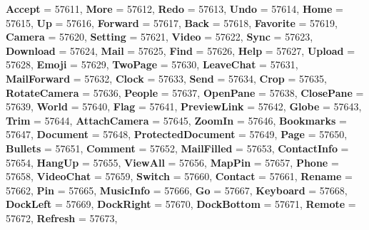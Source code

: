 \begin{DoxyCompactItemize}
{\bfseries Accept} = 57611, 
\newline
{\bfseries More} = 57612, 
{\bfseries Redo} = 57613, 
{\bfseries Undo} = 57614, 
{\bfseries Home} = 57615, 
\newline
{\bfseries Up} = 57616, 
{\bfseries Forward} = 57617, 
{\bfseries Back} = 57618, 
{\bfseries Favorite} = 57619, 
\newline
{\bfseries Camera} = 57620, 
{\bfseries Setting} = 57621, 
{\bfseries Video} = 57622, 
{\bfseries Sync} = 57623, 
\newline
{\bfseries Download} = 57624, 
{\bfseries Mail} = 57625, 
{\bfseries Find} = 57626, 
{\bfseries Help} = 57627, 
\newline
{\bfseries Upload} = 57628, 
{\bfseries Emoji} = 57629, 
{\bfseries Two\+Page} = 57630, 
{\bfseries Leave\+Chat} = 57631, 
\newline
{\bfseries Mail\+Forward} = 57632, 
{\bfseries Clock} = 57633, 
{\bfseries Send} = 57634, 
{\bfseries Crop} = 57635, 
\newline
{\bfseries Rotate\+Camera} = 57636, 
{\bfseries People} = 57637, 
{\bfseries Open\+Pane} = 57638, 
{\bfseries Close\+Pane} = 57639, 
\newline
{\bfseries World} = 57640, 
{\bfseries Flag} = 57641, 
{\bfseries Preview\+Link} = 57642, 
{\bfseries Globe} = 57643, 
\newline
{\bfseries Trim} = 57644, 
{\bfseries Attach\+Camera} = 57645, 
{\bfseries Zoom\+In} = 57646, 
{\bfseries Bookmarks} = 57647, 
\newline
{\bfseries Document} = 57648, 
{\bfseries Protected\+Document} = 57649, 
{\bfseries Page} = 57650, 
{\bfseries Bullets} = 57651, 
\newline
{\bfseries Comment} = 57652, 
{\bfseries Mail\+Filled} = 57653, 
{\bfseries Contact\+Info} = 57654, 
{\bfseries Hang\+Up} = 57655, 
\newline
{\bfseries View\+All} = 57656, 
{\bfseries Map\+Pin} = 57657, 
{\bfseries Phone} = 57658, 
{\bfseries Video\+Chat} = 57659, 
\newline
{\bfseries Switch} = 57660, 
{\bfseries Contact} = 57661, 
{\bfseries Rename} = 57662, 
{\bfseries Pin} = 57665, 
\newline
{\bfseries Music\+Info} = 57666, 
{\bfseries Go} = 57667, 
{\bfseries Keyboard} = 57668, 
{\bfseries Dock\+Left} = 57669, 
\newline
{\bfseries Dock\+Right} = 57670, 
{\bfseries Dock\+Bottom} = 57671, 
{\bfseries Remote} = 57672, 
{\bfseries Refresh} = 57673, 
\newline

\end{DoxyCompactItemize}
